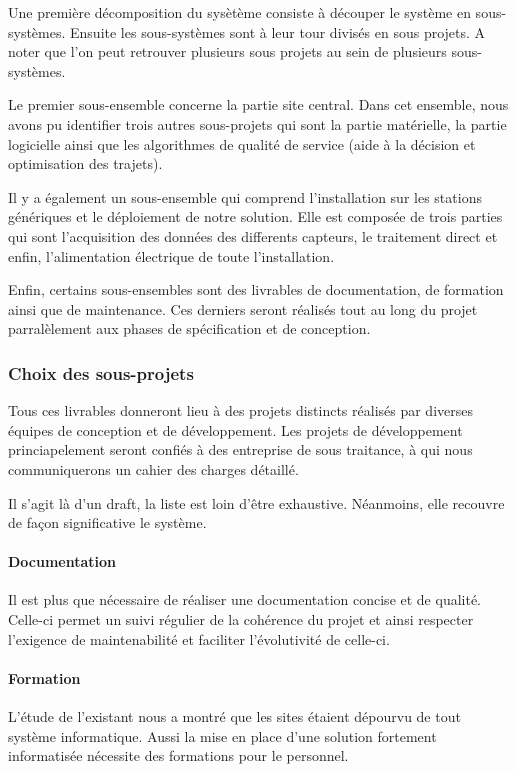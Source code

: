 Une première décomposition du sysètème consiste à découper le système en sous-systèmes.
Ensuite les sous-systèmes sont à leur tour divisés en sous projets. A noter que l'on peut retrouver plusieurs sous projets au sein de plusieurs sous-systèmes.

Le premier sous-ensemble concerne la partie site central. Dans cet
ensemble, nous avons pu identifier trois autres sous-projets qui sont la partie matérielle, la partie
logicielle ainsi que les algorithmes de qualité de service (aide à la décision et optimisation des trajets).

Il y a également un sous-ensemble qui comprend l’installation sur les stations génériques et le déploiement de notre solution. Elle
est composée de trois parties qui sont l'acquisition des données des differents capteurs, le
traitement direct et enfin, l’alimentation électrique de toute l'installation.

Enfin, certains sous-ensembles sont des livrables de documentation, de formation
ainsi que de maintenance. Ces derniers seront réalisés tout au long du projet parralèlement aux phases de spécification et de conception.

\subsubsection{Choix des sous-projets}

Tous ces livrables donneront lieu à des projets distincts réalisés par diverses équipes
de conception et de développement. Les projets de développement princiapelement seront confiés à des entreprise de sous traitance, à qui
nous communiquerons un cahier des charges détaillé.

Il s'agit là d'un draft, la liste est loin d'être exhaustive. Néanmoins, elle recouvre de façon significative le système.

\paragraph{Documentation\\}
Il est plus que nécessaire de réaliser une documentation concise et de qualité. Celle-ci permet un suivi régulier de la cohérence du projet et ainsi
respecter l’exigence de maintenabilité et faciliter l'évolutivité de celle-ci.
\paragraph{Formation\\}
L'étude de l'existant nous a montré que les sites étaient dépourvu de tout système informatique. Aussi la mise en place d'une solution fortement
informatisée nécessite des formations pour le personnel. 


